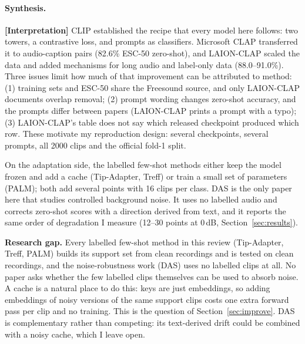 \paragraph{Synthesis.}
\textbf{[Interpretation]} CLIP established the recipe that every model here follows: two towers, a contrastive loss, and prompts as classifiers.
Microsoft CLAP transferred it to audio-caption pairs (82.6\% ESC-50 zero-shot), and LAION-CLAP scaled the data and added mechanisms for long audio and
label-only data (88.0--91.0\%). Three issues limit how much of that improvement can be attributed to method:
(1) training sets and ESC-50 share the Freesound source, and only LAION-CLAP documents overlap removal;
(2) prompt wording changes zero-shot accuracy, and the prompts differ between papers (LAION-CLAP prints a prompt with a typo);
(3) LAION-CLAP's table does not say which released checkpoint produced which row.
These motivate my reproduction design: several checkpoints, several prompts, all 2000 clips and the official fold-1 split.

On the adaptation side, the labelled few-shot methods either keep the model frozen and add a cache (Tip-Adapter, Treff) or train a small set of parameters (PALM); both add several points with 16 clips per class.
DAS is the only paper here that studies controlled background noise. It uses no labelled audio and corrects zero-shot scores with a direction derived from text,
and it reports the same order of degradation I measure (12--30 points at 0\,dB, Section~\ref{sec:results}).

\textbf{Research gap.} Every labelled few-shot method in this review (Tip-Adapter, Treff, PALM) builds its support set from clean recordings and is tested on clean recordings,
and the noise-robustness work (DAS) uses no labelled clips at all.
No paper asks whether the few labelled clips themselves can be used to absorb noise.
A cache is a natural place to do this: keys are just embeddings, so adding embeddings of noisy versions of the same support clips costs one extra forward pass per clip and no training.
This is the question of Section~\ref{sec:improve}. DAS is complementary rather than competing: its text-derived drift could be combined with a noisy cache, which I leave open.
